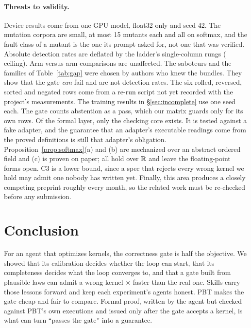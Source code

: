 \paragraph{Threats to validity.}
Device results come from one GPU model, float32 only and seed 42. The mutation corpora
are small, at most 15 mutants each and all on softmax, and the fault class of a mutant is
the one its prompt asked for, not one that was verified. Absolute detection rates are
deflated by the ladder's single-column rungs (\ladderCeiling{} ceiling). Arm-versus-arm
comparisons are unaffected. The saboteurs and the families of Table~\ref{tab:gap} were
chosen by authors who knew the bundles. They show that the gate \emph{can} fail and are
not detection rates. The six rolled, reversed, sorted and negated rows come from a
re-run script not yet recorded with the project's measurements. The training results in
\S\ref{sec:incomplete} use one seed each. The gate counts abstention as a pass, which our
matrix guards only for its own rows. Of the formal layer, only the checking core exists.
It is tested against a fake adapter, and the guarantee that an adapter's executable
readings come from the proved definitions is still that adapter's obligation.
Proposition~\ref{prop:softmax}(a) and (b) are mechanized over an abstract ordered field and
(c) is proven on paper; all hold over $\mathbb{R}$ and leave the floating-point forms open. C3 is a lower bound, since a spec that rejects every wrong
kernel we hold may admit one nobody has written yet. Finally,
this area produces a closely competing preprint roughly every month, so the related work
must be re-checked before any submission.

\section{Conclusion}

For an agent that optimizes kernels, the correctness gate is half the objective. We
showed that its calibration decides whether the loop can start, that its completeness
decides what the loop converges to, and that a gate built from plausible laws can admit a
wrong kernel \fillSpeedup$\times$ faster than the real one. Skills carry those lessons
forward and keep each experiment's agents honest. PBT makes the gate cheap and fair to
compare. Formal proof, written by the agent but checked against PBT's own executions
and issued only after the gate accepts a kernel, is what can turn
``passes the gate'' into a guarantee.
